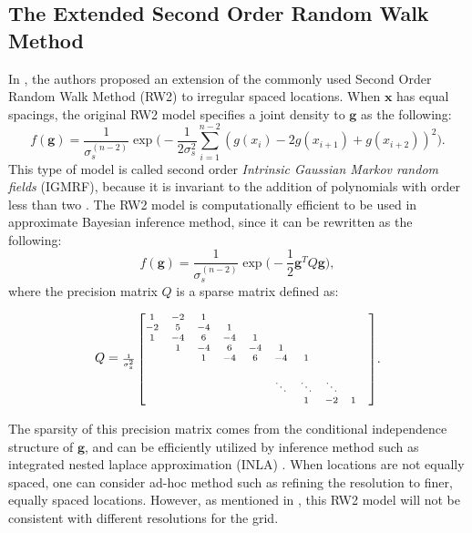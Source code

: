 \documentclass{article}
\begin{document}
\subsection{The Extended Second Order Random Walk Method}

In \cite{rw2}, the authors proposed an extension of the commonly used Second Order Random Walk Method (RW2) to irregular spaced locations. When $\boldsymbol{x}$ has equal spacings, the original RW2 model specifies a joint density to $\boldsymbol{g}$ as the following:
\begin{equation}\label{oldrw2}
f(\boldsymbol{g}) = \frac{1}{\sigma_s^{(n-2)}} \exp \bigg( -\frac{1}{2 \sigma_s^2} \sum_{i=1}^{n-2} (g(x_i) - 2g(x_{i+1}) + g(x_{i+2}))^2 \bigg).
\end{equation}
This type of model is called second order \textit{Intrinsic Gaussian Markov random fields} (IGMRF), because it is invariant to the addition of polynomials with order less than two \citep{rue2005gaussian}. The RW2 model is computationally efficient to be used in approximate Bayesian inference method, since it can be rewritten as the following:
\begin{equation}\label{alter-oldrw2}
f(\boldsymbol{g}) = \frac{1}{\sigma_s^{(n-2)}} \exp \bigg( -\frac{1}{2} \boldsymbol{g}^T Q \boldsymbol{g}  \bigg),
\end{equation}
where the precision matrix $Q$ is a sparse matrix defined as:

\begin{equation}
\begin{aligned}
Q = \mbox{\scriptsize $ \frac{1}{\sigma_s^2} \begin{bmatrix}
1 & -2 & 1 &  &  &  & &  & & \\
-2 & 5 & -4 & 1 &  &  & &  & & \\
1 & -4 & 6  & -4 & 1 &  & &  & & \\
 & 1 & -4 & 6  & -4  & 1  & &  & & \\
 &  & 1 & -4 & 6  & -4  & 1  & & & \\
 & &  & & & & & & & \\
  & &  & & & \ddots & \ddots & \ddots & & \\
   &  &  &  &   &   &  1 &-2 & 1 & \\
\end{bmatrix}
$}
\end{aligned}.
\end{equation}

The sparsity of this precision matrix comes from the conditional independence structure of $\boldsymbol{g}$, and can be efficiently utilized by inference method such as integrated nested laplace approximation (INLA) \citep{inla}. When locations are not equally spaced, one can consider ad-hoc method such as refining the resolution to finer, equally spaced locations. However, as mentioned in \cite{rue2005gaussian}, this RW2 model will not be consistent with different resolutions for the grid.
\end{document}
